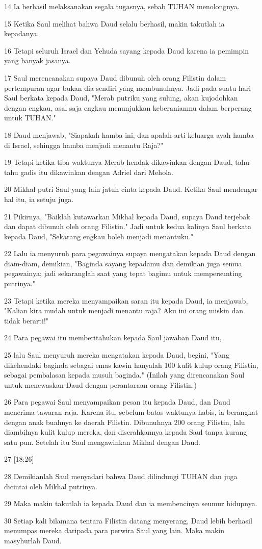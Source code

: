 \par 14 Ia berhasil melaksanakan segala tugasnya, sebab TUHAN menolongnya.
\par 15 Ketika Saul melihat bahwa Daud selalu berhasil, makin takutlah ia kepadanya.
\par 16 Tetapi seluruh Israel dan Yehuda sayang kepada Daud karena ia pemimpin yang banyak jasanya.
\par 17 Saul merencanakan supaya Daud dibunuh oleh orang Filistin dalam pertempuran agar bukan dia sendiri yang membunuhnya. Jadi pada suatu hari Saul berkata kepada Daud, "Merab putriku yang sulung, akan kujodohkan dengan engkau, asal saja engkau menunjukkan keberanianmu dalam berperang untuk TUHAN."
\par 18 Daud menjawab, "Siapakah hamba ini, dan apalah arti keluarga ayah hamba di Israel, sehingga hamba menjadi menantu Raja?"
\par 19 Tetapi ketika tiba waktunya Merab hendak dikawinkan dengan Daud, tahu-tahu gadis itu dikawinkan dengan Adriel dari Mehola.
\par 20 Mikhal putri Saul yang lain jatuh cinta kepada Daud. Ketika Saul mendengar hal itu, ia setuju juga.
\par 21 Pikirnya, "Baiklah kutawarkan Mikhal kepada Daud, supaya Daud terjebak dan dapat dibunuh oleh orang Filistin." Jadi untuk kedua kalinya Saul berkata kepada Daud, "Sekarang engkau boleh menjadi menantuku."
\par 22 Lalu ia menyuruh para pegawainya supaya mengatakan kepada Daud dengan diam-diam, demikian, "Baginda sayang kepadamu dan demikian juga semua pegawainya; jadi sekaranglah saat yang tepat bagimu untuk mempersunting putrinya."
\par 23 Tetapi ketika mereka menyampaikan saran itu kepada Daud, ia menjawab, "Kalian kira mudah untuk menjadi menantu raja? Aku ini orang miskin dan tidak berarti!"
\par 24 Para pegawai itu memberitahukan kepada Saul jawaban Daud itu,
\par 25 lalu Saul menyuruh mereka mengatakan kepada Daud, begini, "Yang dikehendaki baginda sebagai emas kawin hanyalah 100 kulit kulup orang Filistin, sebagai pembalasan kepada musuh baginda." (Inilah yang direncanakan Saul untuk menewaskan Daud dengan perantaraan orang Filistin.)
\par 26 Para pegawai Saul menyampaikan pesan itu kepada Daud, dan Daud menerima tawaran raja. Karena itu, sebelum batas waktunya habis, ia berangkat dengan anak buahnya ke daerah Filistin. Dibunuhnya 200 orang Filistin, lalu diambilnya kulit kulup mereka, dan diserahkannya kepada Saul tanpa kurang satu pun. Setelah itu Saul mengawinkan Mikhal dengan Daud.
\par 27 [18:26]
\par 28 Demikianlah Saul menyadari bahwa Daud dilindungi TUHAN dan juga dicintai oleh Mikhal putrinya.
\par 29 Maka makin takutlah ia kepada Daud dan ia membencinya seumur hidupnya.
\par 30 Setiap kali bilamana tentara Filistin datang menyerang, Daud lebih berhasil menumpas mereka daripada para perwira Saul yang lain. Maka makin masyhurlah Daud.

